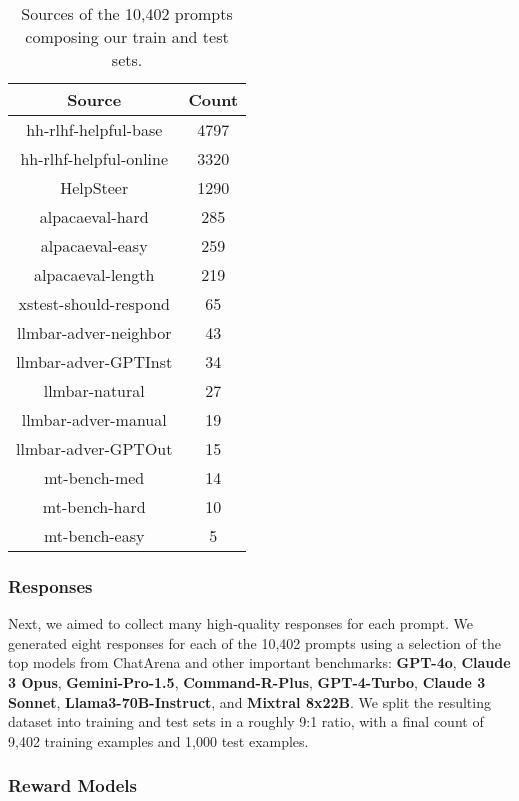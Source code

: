 \begin{table}[!ht]
    \centering
    \begin{tabular}{cc}
        \toprule
        Source & Count \\
        \midrule
        hh-rlhf-helpful-base & 4797 \\
        hh-rlhf-helpful-online & 3320 \\
        HelpSteer & 1290 \\
        alpacaeval-hard & 285 \\
        alpacaeval-easy & 259 \\
        alpacaeval-length & 219 \\
        xstest-should-respond & 65 \\
        llmbar-adver-neighbor & 43 \\
        llmbar-adver-GPTInst & 34 \\
        llmbar-natural & 27 \\
        llmbar-adver-manual & 19 \\
        llmbar-adver-GPTOut & 15 \\
        mt-bench-med & 14 \\
        mt-bench-hard & 10 \\
        mt-bench-easy & 5 \\
        \bottomrule
    \end{tabular}
    \caption{Sources of the 10,402 prompts composing our train and test sets.}
    \label{tab:prompt_sources}
\end{table}

\subsubsection{Responses}

Next, we aimed to collect many high-quality responses for each prompt. 
We generated eight responses for each of the 10,402 prompts using a selection of the top models from ChatArena and other important benchmarks: \textbf{GPT-4o}, \textbf{Claude 3 Opus}, \textbf{Gemini-Pro-1.5}, \textbf{Command-R-Plus}, \textbf{GPT-4-Turbo}, \textbf{Claude 3 Sonnet}, \textbf{Llama3-70B-Instruct}, and \textbf{Mixtral 8x22B}. We split the resulting dataset into training and test sets in a roughly 9:1 ratio, with a final count of 9,402 training examples and 1,000 test examples.

\subsubsection{Reward Models}

